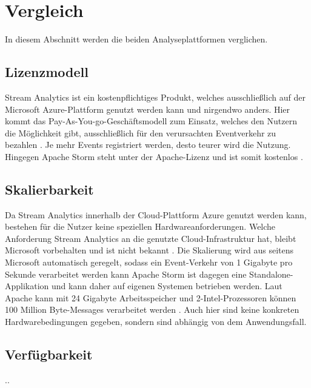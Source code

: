 \section{Vergleich}

In diesem Abschnitt werden die beiden Analyseplattformen verglichen. 


\subsection{Lizenzmodell}
Stream Analytics ist ein kostenpflichtiges Produkt, welches ausschließlich auf der Microsoft Azure-Plattform genutzt werden kann und nirgendwo anders. Hier kommt das Pay-As-You-go-Geschäftsmodell zum Einsatz, welches den Nutzern die Möglichkeit gibt, ausschließlich für den verursachten Eventverkehr zu bezahlen \cite{Pricing.2017}. Je mehr Events registriert werden, desto teurer wird die Nutzung. Hingegen Apache Storm steht unter der Apache-Lizenz und ist somit kostenlos \cite{lizenz.2004}. 

\subsection{Skalierbarkeit}
Da Stream Analytics innerhalb der Cloud-Plattform Azure genutzt werden kann, bestehen für die Nutzer keine speziellen Hardwareanforderungen. Welche Anforderung Stream Analytics an die genutzte Cloud-Infrastruktur hat, bleibt Microsoft vorbehalten und ist nicht bekannt \cite{samacha.2017}. Die Skalierung wird aus seitens Microsoft automatisch geregelt, sodass ein Event-Verkehr von 1 Gigabyte pro Sekunde verarbeitet werden kann \cite{samacha.19.12.2017b} Apache Storm ist dagegen eine Standalone-Applikation und kann daher auf eigenen Systemen betrieben werden. Laut Apache kann mit 24 Gigabyte Arbeitsspeicher und 2-Intel-Prozessoren können 100 Million Byte-Messages verarbeitet werden \cite{apachescale.2017}. Auch hier sind keine konkreten Hardwarebedingungen gegeben, sondern sind abhängig von dem Anwendungsfall.


\subsection{Verfügbarkeit}
..

